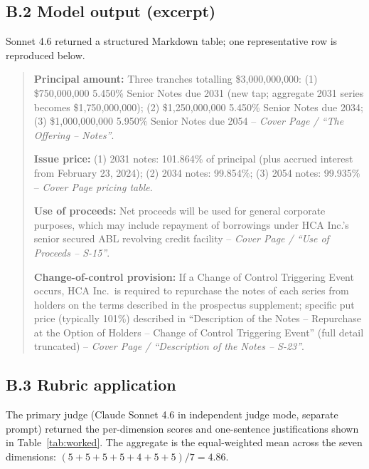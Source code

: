 \documentclass[11pt]{article}
\begin{document}
\subsection*{B.2 Model output (excerpt)}

Sonnet 4.6 returned a structured Markdown table; one representative row is reproduced below.

\begin{quote}\small
\textbf{Principal amount:} Three tranches totalling \$3{,}000{,}000{,}000: (1) \$750{,}000{,}000 5.450\% Senior Notes due 2031 (new tap; aggregate 2031 series becomes \$1{,}750{,}000{,}000); (2) \$1{,}250{,}000{,}000 5.450\% Senior Notes due 2034; (3) \$1{,}000{,}000{,}000 5.950\% Senior Notes due 2054 -- \textit{Cover Page / ``The Offering -- Notes''}.

\textbf{Issue price:} (1) 2031 notes: 101.864\% of principal (plus accrued interest from February 23, 2024); (2) 2034 notes: 99.854\%; (3) 2054 notes: 99.935\% -- \textit{Cover Page pricing table}.

\textbf{Use of proceeds:} Net proceeds will be used for general corporate purposes, which may include repayment of borrowings under HCA Inc.'s senior secured ABL revolving credit facility -- \textit{Cover Page / ``Use of Proceeds -- S-15''}.

\textbf{Change-of-control provision:} If a Change of Control Triggering Event occurs, HCA Inc.\ is required to repurchase the notes of each series from holders on the terms described in the prospectus supplement; specific put price (typically 101\%) described in ``Description of the Notes -- Repurchase at the Option of Holders -- Change of Control Triggering Event'' (full detail truncated) -- \textit{Cover Page / ``Description of the Notes -- S-23''}.
\end{quote}

\subsection*{B.3 Rubric application}

The primary judge (Claude Sonnet 4.6 in independent judge mode, separate prompt) returned the per-dimension scores and one-sentence justifications shown in Table~\ref{tab:worked}. The aggregate is the equal-weighted mean across the seven dimensions: $(5+5+5+5+4+5+5)/7 = 4.86$.
\end{document}
